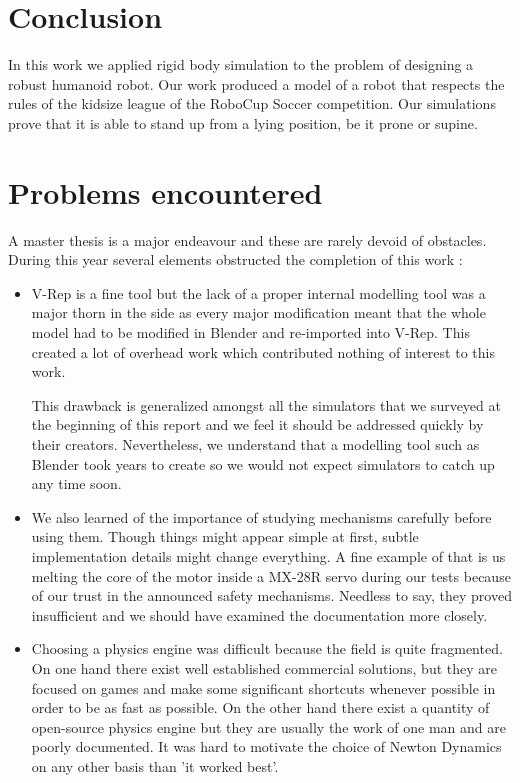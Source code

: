 \section{Conclusion}
In this work we applied rigid body simulation to the problem of designing a robust humanoid robot. Our work produced a model of a robot that respects the rules of the kidsize league of the RoboCup Soccer competition. Our simulations prove that it is able to stand up from a lying position, be it prone or supine. 

\section{Problems encountered}
A master thesis is a major endeavour and these are rarely devoid of obstacles. During this year several elements obstructed the completion of this work : \begin{itemize}
\item V-Rep is a fine tool but the lack of a proper internal modelling tool was a major thorn in the side as every major modification meant that the whole model had to be modified in Blender and re-imported into V-Rep. This created a lot of overhead work which contributed nothing of interest to this work. 

This drawback is generalized amongst all the simulators that we surveyed at the beginning of this report and we feel it should be addressed quickly by their creators. Nevertheless, we understand that a modelling tool such as Blender took years to create so we would not expect simulators to catch up any time soon.

\item We also learned of the importance of studying mechanisms carefully before using them. Though things might appear simple at first, subtle implementation details might change everything. A fine example of that is us melting the core of the motor inside a MX-28R servo during our tests because of our trust in the announced safety mechanisms. Needless to say, they proved insufficient and we should have examined the documentation more closely.

\item Choosing a physics engine was difficult because the field is quite fragmented. On one hand there exist well established commercial solutions, but they are focused on games and make some significant shortcuts whenever possible in order to be as fast as possible. On the other hand there exist a quantity of open-source physics engine but they are usually the work of one man and are poorly documented. It was hard to motivate the choice of Newton Dynamics on any other basis than 'it worked best'.
\end{itemize}

